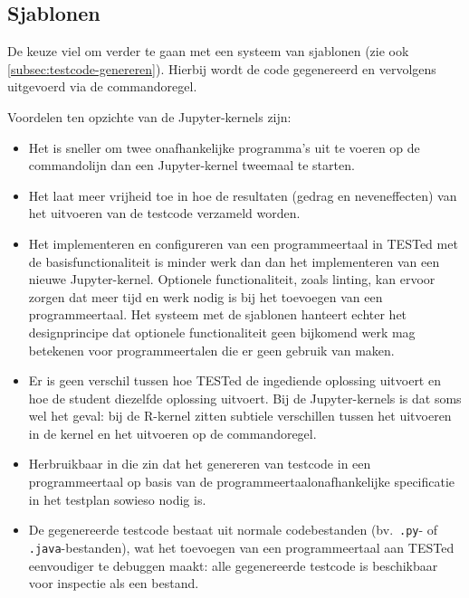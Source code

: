 \subsection{Sjablonen}\label{subsec:sjablonen}

De keuze viel om verder te gaan met een systeem van sjablonen (zie ook \cref{subsec:testcode-genereren}).
Hierbij wordt de code gegenereerd en vervolgens uitgevoerd via de commandoregel.

Voordelen ten opzichte van de Jupyter-kernels zijn:
\begin{itemize}
    \item Het is sneller om twee onafhankelijke programma's uit te voeren op de commandolijn dan een Jupyter-kernel tweemaal te starten.
    \item Het laat meer vrijheid toe in hoe de resultaten (gedrag en neveneffecten) van het uitvoeren van de testcode verzameld worden.
    \item Het implementeren en configureren van een programmeertaal in TESTed met de basisfunctionaliteit is minder werk dan dan het implementeren van een nieuwe Jupyter-kernel.
    Optionele functionaliteit, zoals linting, kan ervoor zorgen dat meer tijd en werk nodig is bij het toevoegen van een programmeertaal.
    Het systeem met de sjablonen hanteert echter het designprincipe dat optionele functionaliteit geen bijkomend werk mag betekenen voor programmeertalen die er geen gebruik van maken.
    \item Er is geen verschil tussen hoe TESTed de ingediende oplossing uitvoert en hoe de student diezelfde oplossing uitvoert.
    Bij de Jupyter-kernels is dat soms wel het geval: bij de R-kernel zitten subtiele verschillen tussen het uitvoeren in de kernel en het uitvoeren op de commandoregel.
    \item Herbruikbaar in die zin dat het genereren van testcode in een programmeertaal op basis van de programmeertaalonafhankelijke specificatie in het testplan sowieso nodig is.
    \item De gegenereerde testcode bestaat uit normale codebestanden (bv.\ \texttt{.py}- of \texttt{.java}-bestanden), wat het toevoegen van een programmeertaal aan TESTed eenvoudiger te debuggen maakt: alle gegenereerde testcode is beschikbaar voor inspectie als een bestand.
\end{itemize}

